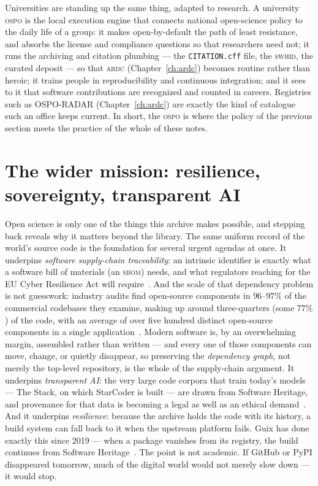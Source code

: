 Universities are standing up the same thing, adapted to research. A university \textsc{ospo} is the
local execution engine that connects national open-science policy to the daily life of a group: it
makes open-by-default the path of least resistance, and absorbs the license and compliance questions
so that researchers need not; it runs the archiving and citation plumbing --- the
\texttt{CITATION.cff} file, the \textsc{swhid}, the curated deposit --- so that \textsc{ardc}
(Chapter~\ref{ch:ardc}) becomes routine rather than heroic; it trains people in reproducibility and
continuous integration; and it sees to it that software contributions are recognized and counted in
careers. Registries such as OSPO-RADAR (Chapter~\ref{ch:ardc}) are exactly the kind of catalogue such
an office keeps current. In short, the \textsc{ospo} is where the policy of the previous section meets
the practice of the whole of these notes.


\section{The wider mission: resilience, sovereignty, transparent AI}

Open science is only one of the things this archive makes possible, and stepping back reveals why it
matters beyond the library. The same uniform record of the world's source code is the foundation for
several urgent agendas at once. It underpins \emph{software supply-chain traceability}: an
intrinsic identifier is exactly what a software bill of materials (an \textsc{sbom}) needs, and what
regulators reaching for the EU Cyber Resilience Act will
require~\autocite{EU_CRA_2024,barais2025swhidcyber}. And the scale of that dependency problem is not
guesswork: industry audits find open-source components in \(96\)--\(97\%\) of the commercial codebases
they examine, making up around three-quarters (some \(77\%\)) of the code, with an average of over
five hundred distinct open-source components in a single
application~\autocite{ossra2024,ossra2025}. Modern software is, by an overwhelming margin, assembled
rather than written --- and every one of those components can move, change, or quietly disappear, so
preserving the \emph{dependency graph}, not merely the top-level repository, is the whole of the
supply-chain argument. It underpins
\emph{transparent AI}: the very large code corpora that train today's models --- The Stack, on which
StarCoder is built --- are drawn from Software Heritage, and provenance for that data is becoming a
legal as well as an ethical demand~\autocite{StarCoder2_2024}. And it underpins \emph{resilience}:
because the archive holds the code with its history, a build system can fall back to it when the
upstream platform fails. Guix has done exactly this since 2019 --- when a package vanishes from its
registry, the build continues from Software Heritage~\autocite{dicosmo_tpdl_2022,SWHecosystems2023}.
The point is not academic. If GitHub or PyPI disappeared tomorrow, much of the digital world would
not merely slow down --- it would stop.


